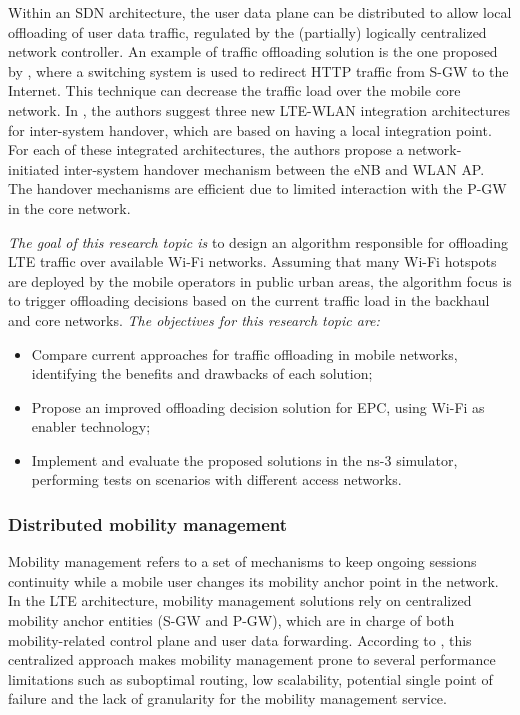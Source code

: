 Within an \ac{SDN} architecture, the user data plane can be distributed to
allow local offloading of user data traffic, regulated by the (partially)
logically centralized network controller. An example of traffic offloading
solution is the one proposed by \citet{Ghazisaeedi2013}, where a switching
system is used to redirect \ac{HTTP} traffic from \ac{S-GW} to the Internet.
This technique can decrease the traffic load over the mobile core network. In
\citet{Tomici2015}, the authors suggest three new \ac{LTE}-\ac{WLAN}
integration architectures for inter-system handover, which are based on having
a local integration point. For each of these integrated architectures, the
authors propose a network-initiated inter-system handover mechanism between the
\ac{eNB} and \ac{WLAN} \ac{AP}. The handover mechanisms are efficient due to
limited interaction with the \ac{P-GW} in the core network.

\emph{The goal of this research topic is} to design an algorithm responsible
for offloading \ac{LTE} traffic over available Wi-Fi networks. Assuming that
many Wi-Fi hotspots are deployed by the mobile operators in public urban areas,
the algorithm focus is to trigger offloading decisions based on the current
traffic load in the backhaul and core networks.
\emph{The objectives for this research topic are:}
\begin{itemize}
  \item Compare current approaches for traffic offloading in mobile networks,
  identifying the benefits and drawbacks of each solution;

  \item Propose an improved offloading decision solution for \ac{EPC}, using
  Wi-Fi as enabler technology;

  \item Implement and evaluate the proposed solutions in the \ac{ns-3}
  simulator, performing tests on scenarios with different access networks.
\end{itemize}

\subsubsection{Distributed mobility management}
\label{subsec:handover}

Mobility management refers to a set of mechanisms to keep ongoing sessions
continuity while a mobile user changes its mobility anchor point in the
network. In the \ac{LTE} architecture, mobility management solutions rely on
centralized mobility anchor entities (\ac{S-GW} and \ac{P-GW}), which are in
charge of both mobility-related control plane and user data forwarding.
According to \citet{Valtulina2014}, this centralized approach makes mobility
management prone to several performance limitations such as suboptimal
routing, low scalability, potential single point of failure and the lack of
granularity for the mobility management service.

